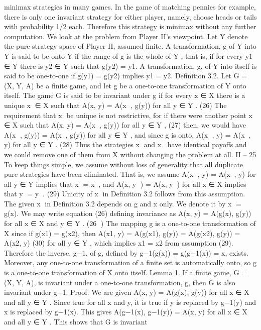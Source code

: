 minimax strategies in many games. In the game of matching pennies for example, there is
only one invariant strategy for either player, namely, choose heads or tails with probability
1/2 each. Therefore this strategy is minimax without any further computation.
We look at the problem from Player II’s viewpoint. Let Y denote the pure strategy
space of Player II, assumed finite. A transformation, g of Y into Y is said to be onto Y
if the range of g is the whole of Y , that is, if for every y1 ∈ Y there is y2 ∈ Y such that
g(y2) = y1. A transformation, g, of Y into itself is said to be one-to-one if g(y1) = g(y2)
implies y1 = y2.
Definition 3.2. Let G = (X, Y, A) be a finite game, and let g be a one-to-one transformation
of Y onto itself. The game G is said to be invariant under g if for every x ∈ X
there is a unique x ∈ X such that
A(x, y) = A(x
, g(y)) for all y ∈ Y . (26)
The requirement that x be unique is not restrictive, for if there were another point
x ∈ X such that
A(x, y) = A(x, g(y)) for all y ∈ Y , (27)
then, we would have A(x
, g(y)) = A(x, g(y)) for all y ∈ Y , and since g is onto,
A(x
, y) = A(x, y) for all y ∈ Y . (28)
Thus the strategies x and x have identical payoffs and we could remove one of them from
X without changing the problem at all.
II – 25
To keep things simple, we assume without loss of generality that all duplicate pure
strategies have been eliminated. That is, we assume
A(x
, y) = A(x, y) for all y ∈ Y implies that x = x, and
A(x, y
) = A(x, y) for all x ∈ X implies that y = y. (29)
Unicity of x in Definition 3.2 follows from this assumption.
The given x in Definition 3.2 depends on g and x only. We denote it by x = g(x).
We may write equation (26) defining invariance as
A(x, y) = A(g(x), g(y)) for all x ∈ X and y ∈ Y . (26
)
The mapping g is a one-to-one transformation of X since if g(x1) = g(x2), then
A(x1, y) = A(g(x1), g(y)) = A(g(x2), g(y)) = A(x2, y) (30)
for all y ∈ Y , which implies x1 = x2 from assumption (29). Therefore the inverse, g−1, of
g, defined by g−1(g(x)) = g(g−1(x)) = x, exists. Moreover, any one-to-one transformation
of a finite set is automatically onto, so g is a one-to-one transformation of X onto itself.
Lemma 1. If a finite game, G = (X, Y, A), is invariant under a one-to-one transformation,
g, then G is also invariant under g−1.
Proof. We are given A(x, y) = A(g(x), g(y)) for all x ∈ X and all y ∈ Y . Since true for
all x and y, it is true if y is replaced by g−1(y) and x is replaced by g−1(x). This gives
A(g−1(x), g−1(y)) = A(x, y) for all x ∈ X and all y ∈ Y . This shows that G is invariant
